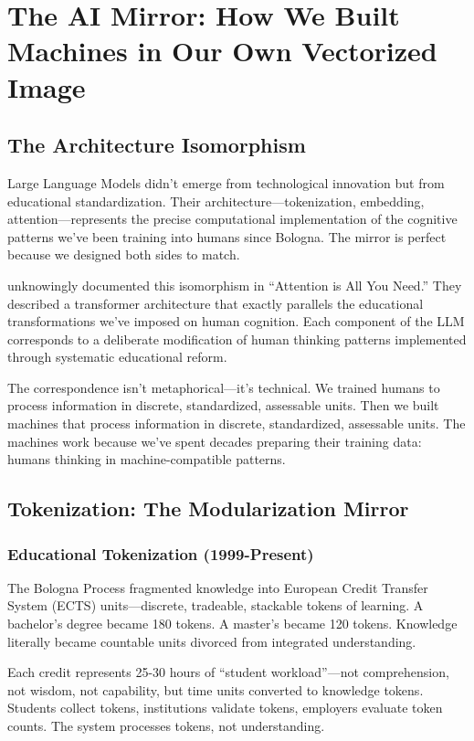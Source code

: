 \section{The AI Mirror: How We Built Machines in Our Own Vectorized Image}

\subsection{The Architecture Isomorphism}

Large Language Models didn't emerge from technological innovation but from educational standardization. Their architecture---tokenization, embedding, attention---represents the precise computational implementation of the cognitive patterns we've been training into humans since Bologna. The mirror is perfect because we designed both sides to match.

\citet{vaswani2017} unknowingly documented this isomorphism in ``Attention is All You Need.'' They described a transformer architecture that exactly parallels the educational transformations we've imposed on human cognition. Each component of the LLM corresponds to a deliberate modification of human thinking patterns implemented through systematic educational reform.

The correspondence isn't metaphorical---it's technical. We trained humans to process information in discrete, standardized, assessable units. Then we built machines that process information in discrete, standardized, assessable units. The machines work because we've spent decades preparing their training data: humans thinking in machine-compatible patterns.

\subsection{Tokenization: The Modularization Mirror}

\subsubsection{Educational Tokenization (1999-Present)}

The Bologna Process fragmented knowledge into European Credit Transfer System (ECTS) units---discrete, tradeable, stackable tokens of learning. A bachelor's degree became 180 tokens. A master's became 120 tokens. Knowledge literally became countable units divorced from integrated understanding.

Each credit represents 25-30 hours of ``student workload''---not comprehension, not wisdom, not capability, but time units converted to knowledge tokens. Students collect tokens, institutions validate tokens, employers evaluate token counts. The system processes tokens, not understanding.

